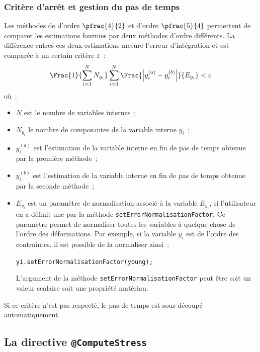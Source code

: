 \documentclass[rectoverso,pleiades,pstricks,leqno,anti]{texmf/note_technique_2010}
\begin{document}
\subsubsection{Critère d'arrêt et gestion du pas de temps}

Les méthodes de  d'ordre $\pfrac{4}{2}$ et d'ordre
$\pfrac{5}{4}$ permettent de comparer les estimations fournies par deux
méthodes d'ordre différents. La différence entres ces deux estimations
mesure l'erreur d'intégration et est comparée à un certain critère
\(\varepsilon\)~:
\begin{equation}
  \label{eq:RK:epsilon}
  \Frac{1}{\displaystyle\sum_{i=1}^{N}N_{y_{i}}}\displaystyle\sum_{i=1}^{N}\Frac{\left|
 y_{i}^{(a)}-y_{i}^{(b)}\right|}{E_{y_{i}}}<\varepsilon
\end{equation}
où~:
\begin{minipage}[t]{0.9\linewidth}
  \begin{itemize}
    \item \(N\) est le nombre de variables internes~;
    \item \(N_{y_{i}}\) le nombre de composantes de la variable interne
    \(y_{i}\)~;
    \item \(y_{i}^{(a)}\) est l'estimation de la variable interne en fin
    de pas de temps obtenue par la première méthode~;
    \item \(y_{i}^{(b)}\) est l'estimation de la variable interne en fin
    de pas de temps obtenue par la seconde méthode~;
    \item \(E_{y_{i}}\) est un paramètre de normalisation associé à la
    variable \(E_{y_{i}}\), si l'utilisateur en a définit une par la
    méthode \texttt{set\-Error\-Norma\-lisa\-tion\-Factor}. Ce paramètre
    permet de normaliser toutes les variables à quelque chose de l'ordre
    des déformations. Par exemple, si la variable \(y_{i}\) est de
    l'ordre des contraintes, il est possible de la normaliser ainsi~:
    \begin{center}
      \texttt{yi.setErrorNormalisationFactor(young);}
    \end{center}
    L'argument de la méthode
    \texttt{set\-Error\-Norma\-lisa\-tion\-Factor} peut être soit un
    valeur scalaire soit une propriété matériau.
  \end{itemize}
\end{minipage}

Si ce critère n'est pas respecté, le pas de temps est sous-découpé
automatiquement.

\subsection{La directive \texttt{@ComputeStress}}
\end{document}
